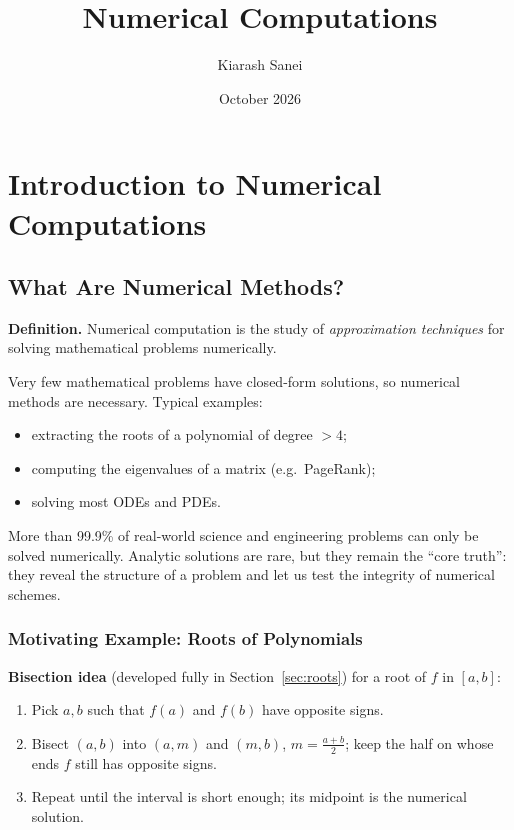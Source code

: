 \documentclass[hidelinks]{article}
\title{\color{carminered}\textbf{Numerical Computations}}
\author{\color{Thistle}Kiarash Sanei}
\date{\color{SkyBlue}October 2026}
\begin{document}
\maketitle
\begin{Large}
\tableofcontents
\end{Large}
\newpage
\section{Introduction to Numerical Computations}

\subsection{What Are Numerical Methods?}

\textbf{Definition.} Numerical computation is the study of \emph{approximation techniques} for solving mathematical problems numerically.

Very few mathematical problems have closed-form solutions, so numerical methods are necessary. Typical examples:
\begin{itemize}
    \item extracting the roots of a polynomial of degree $>4$;
    \item computing the eigenvalues of a matrix (e.g.\ PageRank);
    \item solving most ODEs and PDEs.
\end{itemize}

More than 99.9\% of real-world science and engineering problems can only be solved numerically. Analytic solutions are rare, but they remain the ``core truth'': they reveal the structure of a problem and let us test the integrity of numerical schemes.

\subsubsection{Motivating Example: Roots of Polynomials}

\textbf{Bisection idea} (developed fully in Section~\ref{sec:roots}) for a root of $f$ in $[a,b]$:
\begin{enumerate}
    \item Pick $a,b$ such that $f(a)$ and $f(b)$ have opposite signs.
    \item Bisect $(a,b)$ into $(a,m)$ and $(m,b)$, $m=\tfrac{a+b}{2}$; keep the half on whose ends $f$ still has opposite signs.
    \item Repeat until the interval is short enough; its midpoint is the numerical solution.
\end{enumerate}
\end{document}
